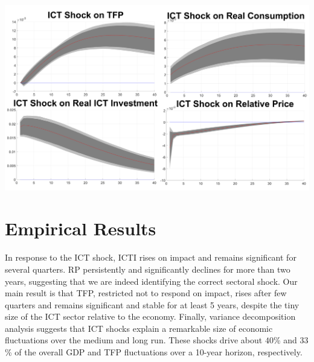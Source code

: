 \documentclass[a0,landscape]{a0poster}
\begin{document}
\begin{multicols}{4}

\begin{center}\vspace{1cm}
	\includegraphics[width=1\linewidth]{alltogether}
\end{center}\vspace{1cm}

\section*{Empirical Results}

In response to the ICT shock, ICTI rises on impact and remains significant for several quarters. RP persistently and significantly declines for more than two years, suggesting that we are indeed identifying the correct sectoral shock. Our main result is that TFP, restricted not to respond on impact, rises after few quarters and remains significant and stable for at least 5 years, despite the tiny size of the ICT sector relative to the economy. Finally, variance decomposition analysis suggests that ICT shocks explain a remarkable size of economic fluctuations over the medium and long run. These shocks drive about $40$\% and $33$\% of the overall GDP and TFP fluctuations over a 10-year horizon, respectively.


\end{multicols}
\end{document}
